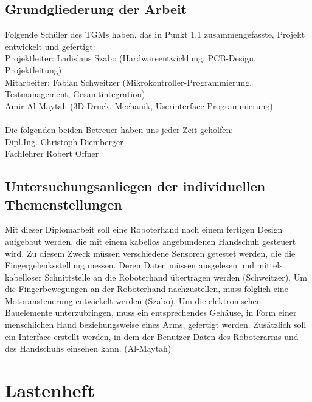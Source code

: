 \documentclass[titlepage,12pt,twoside]{article}
\begin{document}
\subsection{Grundgliederung der Arbeit}
Folgende Schüler des TGMs haben, das in Punkt 1.1 zusammengefasste, Projekt entwickelt und gefertigt: \hfill \break
\\
Projektleiter:    Ladislaus Szabo (Hardwareentwicklung, PCB-Design, Projektleitung)\\
Mitarbeiter: Fabian Schweitzer (Mikrokontroller-Programmierung, Testmanagement, Gesamtintegration)\\
Amir Al-Maytah (3D-Druck, Mechanik, Userinterface-Programmierung) 
\\
\\
Die folgenden beiden Betreuer haben uns jeder Zeit geholfen:
\\
Dipl.Ing. Christoph Diemberger \\
Fachlehrer Robert Offner

\subsection{Untersuchungsanliegen der individuellen Themenstellungen}
Mit dieser Diplomarbeit soll eine Roboterhand nach einem fertigen Design aufgebaut werden,
die mit einem kabellos angebundenen Handschuh gesteuert wird. Zu diesem Zweck müssen
verschiedene Sensoren getestet werden, die die Fingergelenksstellung messen. Deren Daten
müssen ausgelesen und mittels kabelloser Schnittstelle an die Roboterhand übertragen werden
(Schweitzer). Um die Fingerbewegungen an der Roboterhand nachzustellen, muss folglich eine
Motoransteuerung entwickelt werden (Szabo). Um die elektronischen Bauelemente
unterzubringen, muss ein entsprechendes Gehäuse, in Form einer menschlichen Hand
beziehungsweise eines Arms, gefertigt werden. Zusätzlich soll ein Interface erstellt werden, in
dem der Benutzer Daten des Roboterarms und des Handschuhs einsehen kann. (Al-Maytah) \\

\hfill \break
\hfill \break
\hfill \break
\hfill \break
\hfill \break
\hfill \break
\hfill \break
\hfill \break

\section{Lastenheft}
\end{document}
